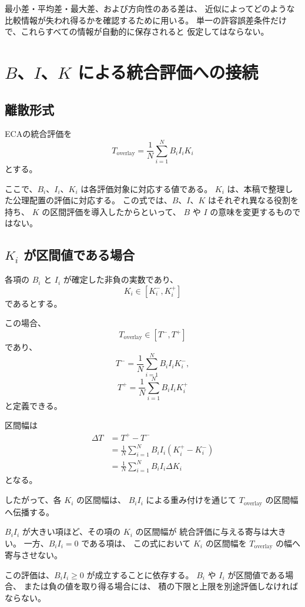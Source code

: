 \documentclass[a4paper,12pt]{article}
\begin{document}
最小差・平均差・最大差、および方向性のある差は、
近似によってどのような比較情報が失われ得るかを確認するために用いる。
単一の許容誤差条件だけで、これらすべての情報が自動的に保存されると
仮定してはならない。

\section{$B$、$I$、$K$ による統合評価への接続}

\subsection{離散形式}

ECAの統合評価を
\[
    T_{\mathrm{overlay}}
    =
    \frac{1}{N}\sum_{i=1}^{N}B_iI_iK_i
\]
とする。

ここで、$B_i$、$I_i$、$K_i$ は各評価対象に対応する値である。
$K_i$ は、本稿で整理した公理配置の評価に対応する。
この式では、$B$、$I$、$K$ はそれぞれ異なる役割を持ち、
$K$ の区間評価を導入したからといって、
$B$ や $I$ の意味を変更するものではない。

\subsection{$K_i$ が区間値である場合}

各項の $B_i$ と $I_i$ が確定した非負の実数であり、
\[
    K_i\in[K_i^-,K_i^+]
\]
であるとする。

この場合、
\[
    T_{\mathrm{overlay}}
    \in[T^-,T^+]
\]
であり、
\[
    T^-=
    \frac{1}{N}\sum_{i=1}^{N}B_iI_iK_i^-,
\]
\[
    T^+=
    \frac{1}{N}\sum_{i=1}^{N}B_iI_iK_i^+
\]
と定義できる。

区間幅は
\[
\begin{aligned}
    \Delta T
    &=T^+-T^-\\
    &=\frac{1}{N}
      \sum_{i=1}^{N}B_iI_i(K_i^+-K_i^-)\\
    &=\frac{1}{N}
      \sum_{i=1}^{N}B_iI_i\Delta K_i
\end{aligned}
\]
となる。

したがって、各 $K_i$ の区間幅は、
$B_iI_i$ による重み付けを通じて
$T_{\mathrm{overlay}}$ の区間幅へ伝播する。

$B_iI_i$ が大きい項ほど、その項の $K_i$ の区間幅が
統合評価に与える寄与は大きい。
一方、$B_iI_i=0$ である項は、
この式において $K_i$ の区間幅を
$T_{\mathrm{overlay}}$ の幅へ寄与させない。

この評価は、$B_iI_i\geq0$ が成立することに依存する。
$B_i$ や $I_i$ が区間値である場合、
または負の値を取り得る場合には、
積の下限と上限を別途評価しなければならない。
\end{document}
